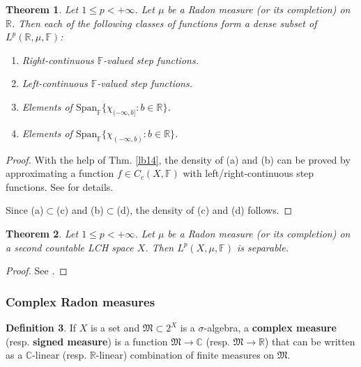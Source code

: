 \documentclass[12pt,b5paper,notitlepage]{article}
\theoremstyle{definition}
\newtheorem{df}{Definition}[section]
\theoremstyle{plain}
\newtheorem{thm}[df]{Theorem}
\newcommand{\fk}{\mathfrak}
\newcommand{\Span}{\mathrm{Span}}
\newcommand{\Cbb}{\mathbb C}
\newcommand{\Rbb}{\mathbb R}
\newcommand{\Fbb}{\mathbb F}
\numberwithin{equation}{section}
\begin{document}
\begin{thm}\label{lb77}
Let $1\leq p<+\infty$. Let $\mu$ be a Radon measure (or its completion) on $\Rbb$. Then each of the following classes of functions form a dense subset of $L^p(\Rbb,\mu,\Fbb)$:
\begin{enumerate}[label=(\alph*)]
\item Right-continuous $\Fbb$-valued step functions.
\item Left-continuous $\Fbb$-valued step functions.
\item Elements of $\Span_\Fbb\{\chi_{(-\infty,b]}:b\in\Rbb\}$.
\item Elements of $\Span_\Fbb\{\chi_{(-\infty,b)}:b\in\Rbb\}$.
\end{enumerate}
\end{thm}

\begin{proof}
With the help of Thm. \ref{lb14}, the density of (a) and (b) can be proved by approximating a function $f\in C_c(X,\Fbb)$ with left/right-continuous step functions. See \cite[Sec. 27.2]{Gui-A} for details.

Since (a)$\subset$(c) and (b)$\subset$(d), the density of (c) and (d) follows.
\end{proof}




\begin{thm}\label{lb85}
Let $1\leq p<+\infty$. Let $\mu$ be a Radon measure (or its completion) on a second countable LCH space $X$. Then $L^p(X,\mu,\Fbb)$ is separable.
\end{thm}


\begin{proof}
See \cite[Sec. 27.2]{Gui-A}.
\end{proof}






\subsubsection{Complex Radon measures}


\begin{df}
If $X$ is a set and $\fk M\subset 2^X$ is a $\sigma$-algebra, a \textbf{complex measure}  (resp. \textbf{signed measure})  is a function $\fk M\rightarrow \Cbb$ (resp. $\fk M\rightarrow\Rbb$) that can be written as a $\Cbb$-linear (resp. $\Rbb$-linear) combination of finite measures on $\fk M$.
\end{df}
\end{document}
